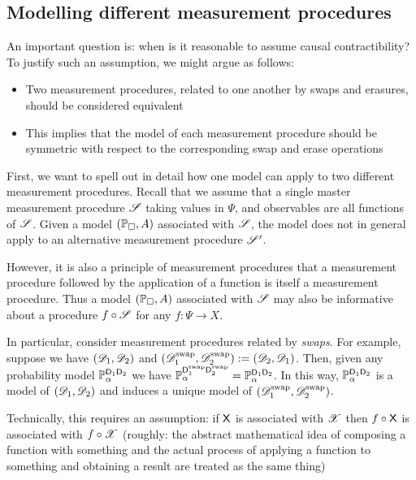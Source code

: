 \subsection{Modelling different measurement procedures}

An important question is: when is it reasonable to assume causal contractibility? To justify such an assumption, we might argue as follows:
\begin{itemize}
    \item Two measurement procedures, related to one another by swaps and erasures, should be considered equivalent
    \item This implies that the model of each measurement procedure should be symmetric with respect to the corresponding swap and erase operations
\end{itemize}

First, we want to spell out in detail how one model can apply to two different measurement procedures. Recall that we assume that a single master measurement procedure $\mathscr{S}$ taking values in $\Psi$, and observables are all functions of $\mathscr{S}$. Given a model $(\mathbb{P}_\square,A)$ associated with $\mathscr{S}$, the model does not in general apply to an alternative measurement procedure $\mathscr{S}'$.

However, it is also a principle of measurement procedures that a measurement procedure followed by the application of a function is itself a measurement procedure. Thus a model $(\mathbb{P}_\square,A)$ associated with $\mathscr{S}$ may also be informative about a procedure $f\circ \mathscr{S}$ for any $f:\Psi\to X$.

In particular, consider measurement procedures related by \emph{swaps}. For example, suppose we have $(\mathscr{D}_1,\mathscr{D}_2)$ and $(\mathscr{D}^{\text{swap}}_1,\mathscr{D}^{\text{swap}}_2):=(\mathscr{D}_2,\mathscr{D}_1)$. Then, given any probability model $\mathbb{P}_\alpha^{\mathsf{D}_1\mathsf{D}_2}$ we have $\mathbb{P}_\alpha^{\mathsf{D}_1^{\text{swap}}\mathsf{D}_2^{\text{swap}}} = \mathbb{P}_\alpha^{\mathsf{D}_1\mathsf{D}_2}$. In this way, $\mathbb{P}_\alpha^{\mathsf{D}_1\mathsf{D}_2}$ is a model of $(\mathscr{D}_1,\mathscr{D}_2)$ and induces a unique model of $(\mathscr{D}^{\text{swap}}_1,\mathscr{D}^{\text{swap}}_2)$.

Technically, this requires an assumption: if $\mathsf{X}$ is associated with $\mathscr{X}$ then $f\circ \mathsf{X}$ is associated with $f\circ \mathscr{X}$ (roughly: the abstract mathematical idea of composing a function with something and the actual process of applying a function to something and obtaining a result are treated as the same thing)

